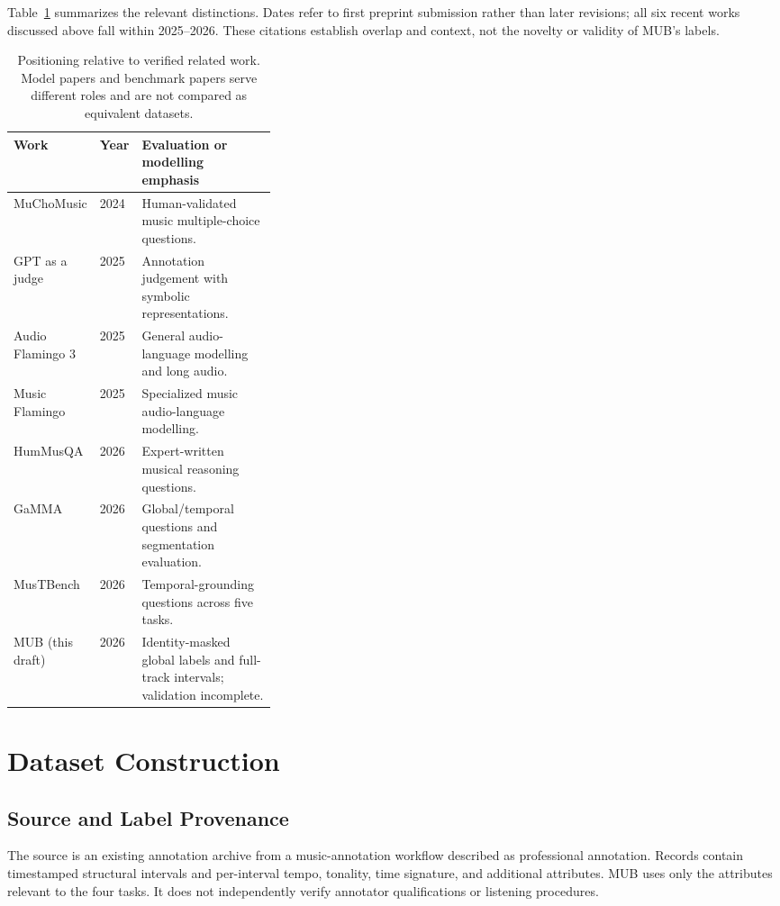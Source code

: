 \documentclass[11pt,a4paper]{article}
\begin{document}
Table~\ref{tab:related} summarizes the relevant distinctions. Dates refer to first preprint submission rather than later revisions; all six recent works discussed above fall within 2025--2026. These citations establish overlap and context, not the novelty or validity of MUB's labels.

\begin{table}[tbp]
\centering\small
\begin{tabularx}{\linewidth}{@{}p{0.22\linewidth}p{0.12\linewidth}X@{}}
\toprule
Work & Year & Evaluation or modelling emphasis \\
\midrule
MuChoMusic & 2024 & Human-validated music multiple-choice questions. \\
GPT as a judge & 2025 & Annotation judgement with symbolic representations. \\
Audio Flamingo 3 & 2025 & General audio-language modelling and long audio. \\
Music Flamingo & 2025 & Specialized music audio-language modelling. \\
HumMusQA & 2026 & Expert-written musical reasoning questions. \\
GaMMA & 2026 & Global/temporal questions and segmentation evaluation. \\
MusTBench & 2026 & Temporal-grounding questions across five tasks. \\
MUB (this draft) & 2026 & Identity-masked global labels and full-track intervals; validation incomplete. \\
\bottomrule
\end{tabularx}
\caption{Positioning relative to verified related work. Model papers and benchmark papers serve different roles and are not compared as equivalent datasets.}
\label{tab:related}
\end{table}

\section{Dataset Construction}
\label{sec:dataset}
\subsection{Source and Label Provenance}
The source is an existing annotation archive from a music-annotation workflow described as professional annotation. Records contain timestamped structural intervals and per-interval tempo, tonality, time signature, and additional attributes. MUB uses only the attributes relevant to the four tasks. It does not independently verify annotator qualifications or listening procedures.
\end{document}
